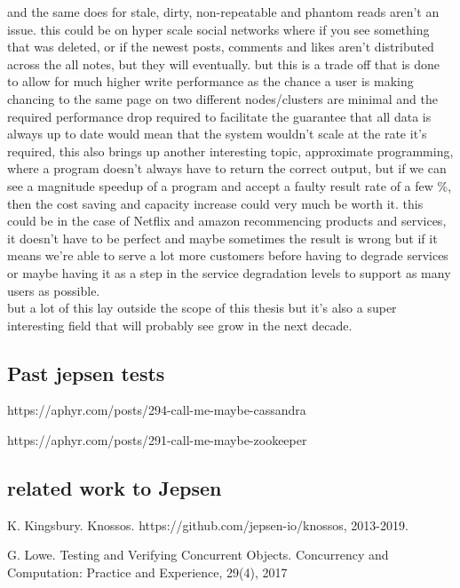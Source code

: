 \documentclass[a4paper,10pt,titlepage]{report}
\begin{document}
and the same does for stale, dirty, non-repeatable and phantom reads aren't an issue. this could be on hyper scale social networks where if you see something that was deleted, or if the newest posts, comments and likes aren't distributed across the all notes, but they will eventually. but this is a trade off that is done to allow for much higher write performance as the chance a user is making chancing to the same page on two different nodes/clusters are minimal and the required performance drop required to facilitate the guarantee that all data is always up to date would mean that the system wouldn't scale at the rate it's required, this also brings up another interesting topic, approximate programming, where a program doesn't always have to return the correct output, but if we can see a magnitude speedup of a program and accept a faulty result rate of a few \%, then the cost saving and capacity increase could very much be worth it. this could be in the case of Netflix and amazon recommencing products and services, it doesn't have to be perfect and maybe sometimes the result is wrong but if it means we're able to serve a lot more customers before having to degrade services or maybe having it as a step in the service degradation levels to support as many users as possible. \\

but a lot of this lay outside the scope of this thesis but it's also a super interesting field that will probably see grow in the next decade.





\subsection{Past jepsen tests}

https://aphyr.com/posts/294-call-me-maybe-cassandra


https://aphyr.com/posts/291-call-me-maybe-zookeeper



\subsection{related work to Jepsen}


K. Kingsbury. Knossos.
https://github.com/jepsen-io/knossos, 2013-2019.

G. Lowe. Testing and Verifying Concurrent Objects.
Concurrency and Computation: Practice and
Experience, 29(4), 2017
\end{document}
